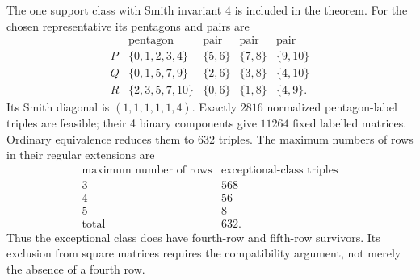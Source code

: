 \documentclass[11pt,a4paper]{article}
\theoremstyle{plain}
\theoremstyle{definition}
\theoremstyle{plain}
\begin{document}
\medskip
The one support class with Smith invariant 4 is included in the theorem. For the chosen representative its pentagons and pairs are
$$\begin{array}{c|c|c|c|c}
&\text{pentagon}&\text{pair}&\text{pair}&\text{pair}\\\hline
P&\{0,1,2,3,4\}&\{5,6\}&\{7,8\}&\{9,10\}\\
Q&\{0,1,5,7,9\}&\{2,6\}&\{3,8\}&\{4,10\}\\
R&\{2,3,5,7,10\}&\{0,6\}&\{1,8\}&\{4,9\}.
\end{array}$$
Its Smith diagonal is $(1,1,1,1,1,4)$. Exactly $2816$ normalized pentagon-label triples are feasible; their 4 binary components give $11264$ fixed labelled matrices. Ordinary equivalence reduces them to $632$ triples. The maximum numbers of rows in their regular extensions are
$$\begin{array}{c|r}
\text{maximum number of rows}&\text{exceptional-class triples}\\\hline
3&568\\4&56\\5&8\\\hline
\text{total}&632.
\end{array}$$
Thus the exceptional class does have fourth-row and fifth-row survivors. Its exclusion from square matrices requires the compatibility argument, not merely the absence of a fourth row.
\end{document}
